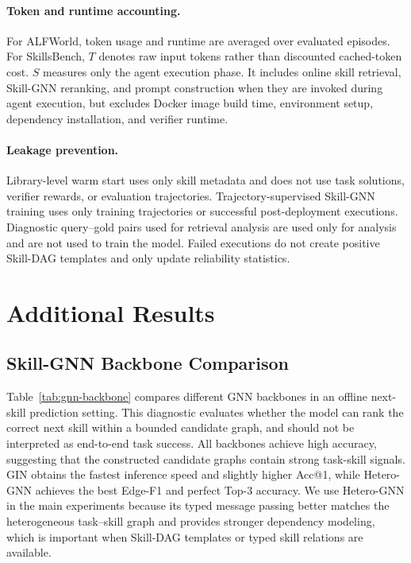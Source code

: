 \documentclass[letterpaper]{article}
\begin{document}
\paragraph{Token and runtime accounting.}
For ALFWorld, token usage and runtime are averaged over evaluated episodes.
For SkillsBench, $T$ denotes raw input tokens rather than discounted
cached-token cost. $S$ measures only the agent execution phase. It includes
online skill retrieval, Skill-GNN reranking, and prompt construction when they
are invoked during agent execution, but excludes Docker image build time,
environment setup, dependency installation, and verifier runtime.

\paragraph{Leakage prevention.}
Library-level warm start uses only skill metadata and does not use task
solutions, verifier rewards, or evaluation trajectories. Trajectory-supervised
Skill-GNN training uses only training trajectories or successful
post-deployment executions. Diagnostic query--gold pairs used for retrieval
analysis are used only for analysis and are not used to train the model. Failed
executions do not create positive Skill-DAG templates and only update reliability
statistics.

\section{Additional Results}

\label{app:additional_results}

\subsection{Skill-GNN Backbone Comparison}
\label{app:gnn_backbone}

Table~\ref{tab:gnn-backbone} compares different GNN backbones in an offline
next-skill prediction setting. This diagnostic evaluates whether the model can
rank the correct next skill within a bounded candidate graph, and should not be
interpreted as end-to-end task success. All backbones achieve high accuracy,
suggesting that the constructed candidate graphs contain strong task-skill
signals. GIN obtains the fastest inference speed and slightly higher Acc@1,
while Hetero-GNN achieves the best Edge-F1 and perfect Top-3 accuracy. We use
Hetero-GNN in the main experiments because its typed message passing better
matches the heterogeneous task--skill graph and provides stronger dependency
modeling, which is important when Skill-DAG templates or typed skill relations
are available.
\end{document}
